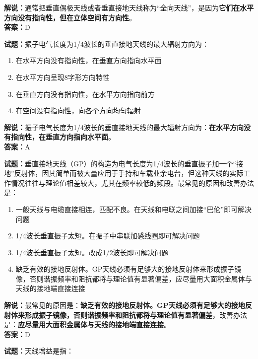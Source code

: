 \documentclass{ctexbook}
\begin{document}
\noindent\textbf{解说：}通常把垂直偶极天线或者垂直接地天线称为“全向天线”，是因为\textbf{它们在水平方向没有指向性，但在立体空间有方向性}。\\\noindent\textbf{答案：}D%


\bigskip


\noindent\textbf{试题：}振子电气长度为1/4波长的垂直接地天线的最大辐射方向为：

\begin{enumerate}[leftmargin=3em]
	\item 在水平方向没有指向性，在垂直方向指向水平面
	\item 在水平方向呈现8字形方向特性
	\item 在垂直方向没有指向性，在水平方向指向前方
	\item 在空间没有指向性，向各个方向均匀辐射
\end{enumerate}

\noindent\textbf{解说：}振子电气长度为1/4波长的垂直接地天线的最大辐射方向为：\textbf{在水平方向没有指向性，在垂直方向指向水平面}。\\\noindent\textbf{答案：}A%


\bigskip


\noindent\textbf{试题：}垂直接地天线（GP）的构造为电气长度为1/4波长的垂直振子加一个“接地”反射体，因其简单而被大量应用于手持和车载业余电台，但这种天线的实际工作情况往往与理论值相差较大，尤其在频率较低的频段。最常见的原因和改善办法是：

\begin{enumerate}[leftmargin=3em]
	\item 一般天线与电缆直接相连，匹配不良。在天线和电联之间加接“巴伦”即可解决问题
	\item 1/4波长垂直振子太短。在振子中串联加感线圈即可解决问题
	\item 1/4波长垂直振子太短。改成1/2波长即可解决问题
	\item 缺乏有效的接地反射体。GP天线必须有足够大的接地反射体来形成振子镜像，否则谐振频率和阻抗都将与理论值有显著偏差，应尽量用大面积金属体与天线的接地端直接连接
\end{enumerate}

\noindent\textbf{解说：}最常见的原因是：\textbf{缺乏有效的接地反射体。GP天线必须有足够大的接地反射体来形成振子镜像，否则谐振频率和阻抗都将与理论值有显著偏差}，改善办法是：\textbf{应尽量用大面积金属体与天线的接地端直接连接}。\\\noindent\textbf{答案：}D


\bigskip


\noindent\textbf{试题：}天线增益是指：
\end{document}
